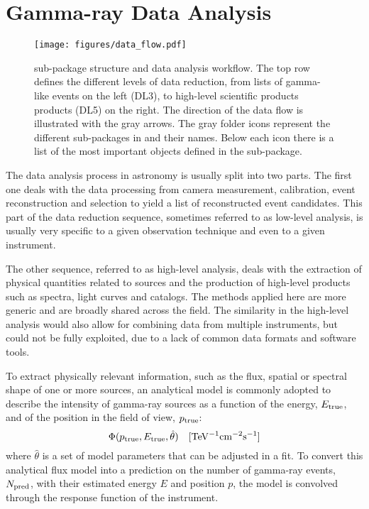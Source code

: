 \documentclass[traditabstract, longauth]{aa}
\begin{document}
\section{Gamma-ray Data Analysis}
\begin{figure*}[h!]
	\centering
	\texttt{[image: figures/data\_flow.pdf]}
	\caption{
		\gammapy sub-package structure and data analysis workflow. The top row
        defines the different levels of data reduction, from lists of gamma-like
        events on the left (DL3), to high-level scientific products products
        (DL5) on the right. The direction of the data flow is illustrated with the
        gray arrows. The gray folder icons represent the different sub-packages
        in \gammapy and their names. Below each icon there is a list of the most
        important objects defined in the sub-package.
    }
	\label{fig:data_flow}
\end{figure*}
%
\label{sec:gammaray-data-analysis}
The data analysis process in \gammaray astronomy is usually split into two parts.
The first one deals with the data processing from camera measurement, calibration, event
reconstruction and selection to yield a list of reconstructed \gammaray event candidates.
This part of the data reduction sequence, sometimes referred to as low-level analysis,
is usually very specific to a given observation technique and even to a given instrument.

The other sequence, referred to as high-level analysis, deals with the extraction of physical
quantities related to \gammaray sources and the production of high-level products such as spectra,
light curves and catalogs. The methods applied here are more generic and are broadly
shared across the field. The similarity in the high-level analysis would also allow
for combining data from multiple instruments, but could not be fully exploited, due to
a lack of common data formats and software tools.


To extract physically relevant information, such as the flux, spatial or spectral shape of one or more sources,
an analytical model is commonly adopted to describe the intensity of gamma-ray sources as a function of the energy,
$E_{\rm true}$, and of the position in the field of view, $p_{\rm true}$:
$$ \Phi(p_{\rm true}, E_{\rm true}, \hat{\theta}) \quad \mathrm{[TeV^{-1}cm^{-2}s^{-1}]} $$
where $\hat{\theta}$ is a set of model parameters that can be adjusted in a fit. To convert this analytical flux model
into a prediction on the number of gamma-ray events, $N_{\rm pred}$, with their estimated energy $E$ and position $p$, the model
is convolved through the response function of the instrument.
\end{document}
